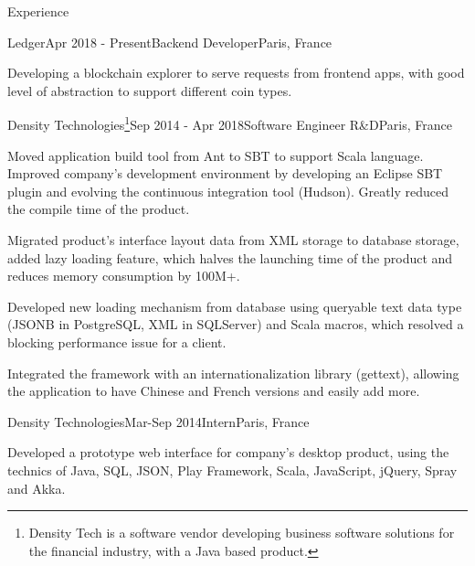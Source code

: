 \documentclass{resume} %
\begin{document}

\begin{rSection}{Experience}

\begin{rSubsection}{Ledger}{Apr 2018 - Present}{Backend Developer}{Paris, France}
\item Developing a blockchain explorer to serve requests from frontend apps, with good level of abstraction to support different coin types.
\end{rSubsection}

\begin{rSubsection}{Density Technologies\footnote{Density Tech is a software vendor developing business software solutions for the financial industry, with a Java based product.}}{Sep 2014 - Apr 2018}{Software Engineer R\&D}{Paris, France}
\item Moved application build tool from Ant to SBT to support Scala language. Improved company's development environment by developing an Eclipse SBT plugin and evolving the continuous integration tool (Hudson). Greatly reduced the compile time of the product.
\item Migrated product's interface layout data from XML storage to database storage, added lazy loading feature, which halves the launching time of the product and reduces memory consumption by 100M+.
\item Developed new loading mechanism from database using queryable text data type (JSONB in PostgreSQL, XML in SQLServer) and Scala macros, which resolved a blocking performance issue for a client.
\item Integrated the framework with an internationalization library (gettext), allowing the application to have Chinese and French versions and easily add more.
\end{rSubsection}

\begin{rSubsection}{Density Technologies}{Mar-Sep 2014}{Intern}{Paris, France}
\item Developed a prototype web interface for company's desktop product, using the technics of Java, SQL, JSON, Play Framework, Scala, JavaScript, jQuery, Spray and Akka.
\end{rSubsection}

\end{rSection}
\end{document}
